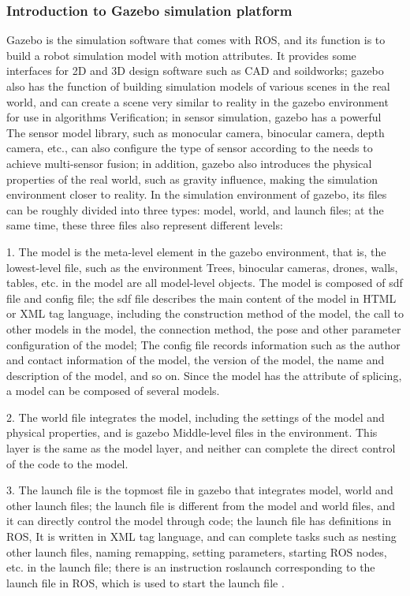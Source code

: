 \documentclass[conference]{IEEEtran}
\begin{document}
\subsubsection{Introduction to Gazebo simulation platform}
Gazebo is the simulation software that comes with ROS, and its function is to build a robot simulation model with motion attributes.
It provides some interfaces for 2D and 3D design software such as CAD and soildworks; gazebo also has the function of building simulation models of various scenes in the real world, and can create a scene very similar to reality in the gazebo environment for use in algorithms Verification; in sensor simulation, gazebo has a powerful
The sensor model library, such as monocular camera, binocular camera, depth camera, etc., can also configure the type of sensor according to the needs to achieve multi-sensor fusion; in addition, gazebo also introduces the physical properties of the real world, such as gravity influence, making the simulation environment closer to reality. In the simulation environment of gazebo, its files can be roughly divided into three types: model, world, and launch files; at the same time, these three files also represent different levels:

1. The model is the meta-level element in the gazebo environment, that is, the lowest-level file, such as the environment
Trees, binocular cameras, drones, walls, tables, etc. in the model are all model-level objects. The model is composed of sdf file and config file; the sdf file describes the main content of the model in HTML or XML tag language, including the construction method of the model, the call to other models in the model, the connection method, the pose and other parameter configuration of the model; The config file records information such as the author and contact information of the model, the version of the model, the name and description of the model, and so on. Since the model has the attribute of splicing, a model can be composed of several models.

2. The world file integrates the model, including the settings of the model and physical properties, and is gazebo
Middle-level files in the environment. This layer is the same as the model layer, and neither can complete the direct control of the code to the model.

3. The launch file is the topmost file in gazebo that integrates model, world and other launch files; the launch file is different from the model and world files, and it can directly control the model through code; the launch file has definitions in ROS, It is written in XML tag language, and can complete tasks such as nesting other launch files, naming remapping, setting parameters, starting ROS nodes, etc. in the launch file; there is an instruction roslaunch corresponding to the launch file in ROS, which is used to start the launch file .
\end{document}
